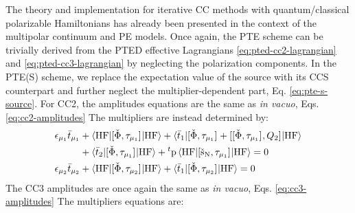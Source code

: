 The theory and implementation for iterative \acrshort{CC} methods with
quantum/classical polarizable Hamiltonians has already been presented in
the context of the multipolar continuum and \acrlong*{PE}
models.\autocite{Kongsted2002-zm, Osted2003-qc, Sneskov2011-jm,
Schwabe2012-cf}
Once again, the \acrshort{PTE} scheme can be trivially derived from the
\acrshort{PTED} effective Lagrangians \eqref{eq:pted-cc2-lagrangian} and
\eqref{eq:pted-cc3-lagrangian} by neglecting the polarization components.
In the \acrshort{PTE(S)} scheme, we replace the expectation value of the
source with its \acrshort{CCS} counterpart and further neglect the
multiplier-dependent part, Eq. \eqref{eq:pte-s-source}.
For \acrshort{CC2}, the amplitudes equations are the same as \emph{in
vacuo}, Eqs. \eqref{eq:cc2-amplitudes} The multipliers are instead
determined by:
\begin{subequations}\label{eq:pte-s-cc2-multipliers}
  \begin{align}
    \epsilon_{\mu_1}\bar{t}_{\mu_1} &+
     \braket{\mathrm{HF} | [ \check{\Phi}, \tau_{\mu_1} ]^{} | \mathrm{HF}}
   + \braket{\bar{t}_{1} |
       [ \check{\Phi}, \tau_{\mu_1} ]^{}
     + [ [ \check{\Phi}, \tau_{\mu_1} ]^{}, Q_2 ]^{}
     | \mathrm{HF}} \nonumber \\
   &+ \braket{\bar{t}_{2} | [ \check{\Phi}, \tau_{\mu_1} ]^{} |
   \mathrm{HF}}
   + {}^t\mathrm{p}\braket{\mathrm{HF} |
   [ \check{\mathrm{s}}_\mathrm{N}, \tau_{\mu_1} ]^{} | \mathrm{HF}}
   = 0 \label{eq:pte-s-cc2-singles-multipliers} \\
    \epsilon_{\mu_2}\bar{t}_{\mu_2} &+
    \braket{\mathrm{HF} | [ \check{\Phi}, \tau_{\mu_2} ]^{} | \mathrm{HF}}
   + \braket{\bar{t}_{1} |
       [ \check{\Phi}, \tau_{\mu_2} ]^{}
     | \mathrm{HF}}
     = 0 \label{eq:pte-s-cc2-doubles-multipliers}
  \end{align}
\end{subequations}
The \acrshort{CC3} amplitudes are once again the same as \emph{in
vacuo}, Eqs. \eqref{eq:cc3-amplitudes}
The multipliers equations are:
